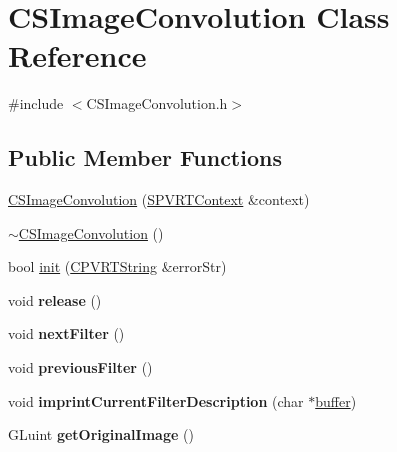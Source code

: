 \hypertarget{class_c_s_image_convolution}{\section{C\+S\+Image\+Convolution Class Reference}
\label{class_c_s_image_convolution}
}


{\ttfamily \#include $<$C\+S\+Image\+Convolution.\+h$>$}

\subsection*{Public Member Functions}
\begin{DoxyCompactItemize}
\item 
\hyperlink{class_c_s_image_convolution_a631f273dfdff3c1e705f1a784048726a}{C\+S\+Image\+Convolution} (\hyperlink{struct_s_p_v_r_t_context}{S\+P\+V\+R\+T\+Context} \&context)
\item 
\hyperlink{class_c_s_image_convolution_a5c239afe0a7354d62cbeea0d01e19ddc}{$\sim$\+C\+S\+Image\+Convolution} ()
\item 
bool \hyperlink{class_c_s_image_convolution_ade1af7c73b7f73759fb870f6c850228a}{init} (\hyperlink{class_c_p_v_r_t_string}{C\+P\+V\+R\+T\+String} \&error\+Str)
\item 
\hypertarget{class_c_s_image_convolution_a55cd57a57ff9c416a716293df90c14cd}{void {\bfseries release} ()}\label{class_c_s_image_convolution_a55cd57a57ff9c416a716293df90c14cd}

\item 
\hypertarget{class_c_s_image_convolution_a8cb4092af02fcb87869cc36452deb2b3}{void {\bfseries next\+Filter} ()}\label{class_c_s_image_convolution_a8cb4092af02fcb87869cc36452deb2b3}

\item 
\hypertarget{class_c_s_image_convolution_a3592cb108e3a2b12de9fce66b5033f6e}{void {\bfseries previous\+Filter} ()}\label{class_c_s_image_convolution_a3592cb108e3a2b12de9fce66b5033f6e}

\item 
\hypertarget{class_c_s_image_convolution_a19627ca553805d7a1bbdd46856a5e223}{void {\bfseries imprint\+Current\+Filter\+Description} (char $\ast$\hyperlink{structbuffer}{buffer})}\label{class_c_s_image_convolution_a19627ca553805d7a1bbdd46856a5e223}

\item 
\hypertarget{class_c_s_image_convolution_a4fafc9a54e2e1dfea750dfac8d8bfac3}{G\+Luint {\bfseries get\+Original\+Image} ()}\label{class_c_s_image_convolution_a4fafc9a54e2e1dfea750dfac8d8bfac3}


\end{DoxyCompactItemize}
